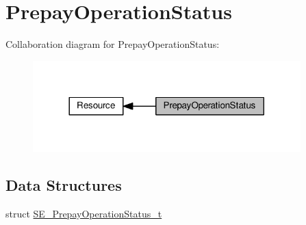 \hypertarget{group__PrepayOperationStatus}{}\section{Prepay\+Operation\+Status}
\label{group__PrepayOperationStatus}
Collaboration diagram for Prepay\+Operation\+Status\+:\nopagebreak
\begin{figure}[H]
\begin{center}
\leavevmode
\includegraphics[width=293pt]{group__PrepayOperationStatus}
\end{center}
\end{figure}
\subsection*{Data Structures}
\begin{DoxyCompactItemize}
\item 
struct \hyperlink{structSE__PrepayOperationStatus__t}{S\+E\+\_\+\+Prepay\+Operation\+Status\+\_\+t}
\end{DoxyCompactItemize}
